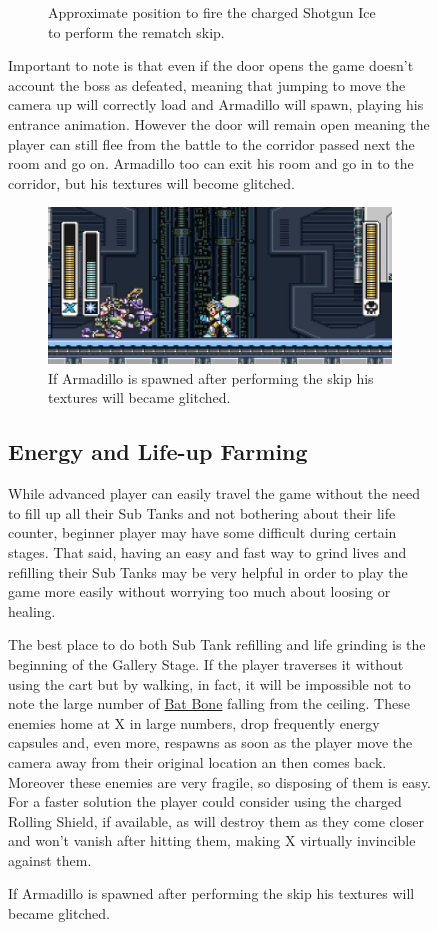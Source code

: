 \begin{figure}[htp]
\begin{figure}[htp]
	\caption{Approximate position to fire the charged Shotgun Ice to perform the rematch skip.}
	\label{Armadillo_skip_positioning}
\end{figure}
Important to note is that even if the door opens the game doesn't account the boss as defeated, meaning that jumping to move the camera up will correctly load and Armadillo will spawn, playing his entrance animation. However the door will remain open meaning the player can still flee from the battle to the corridor passed next the room and go on. Armadillo too can exit his room and go in to the corridor, but his textures will become glitched.

\begin{figure}[htp]
	\centering
	\includegraphics[width=0.5\linewidth]{figures/X1/Miscs/Dillo_glitch.jpg}
	\caption{If Armadillo is spawned after performing the skip his textures will became glitched.}
\end{figure}

\subsection{Energy and Life-up Farming}
While advanced player can easily travel the game without the need to fill up all their Sub Tanks and not bothering about their life counter, beginner player may have some difficult during certain stages. That said, having an easy and fast way to grind lives and refilling their Sub Tanks may be very helpful in order to play the game more easily without worrying too much about loosing or healing.

The best place to do both Sub Tank refilling and life grinding is the beginning of the Gallery Stage. If the player traverses it without using the cart but by walking, in fact, it will be impossible not to note the large number of \hyperlink{enem:Bat_Bone}{Bat Bone}  falling from the ceiling. These enemies home at X in large numbers, drop frequently energy capsules and, even more, respawns as soon as the player move the camera away from their original location an then comes back. Moreover these enemies are very fragile, so disposing of them is easy. For a faster solution the player could consider using the charged Rolling Shield, if available, as will destroy them as they come closer and won't vanish after hitting them, making X virtually invincible against them.


\end{figure}
